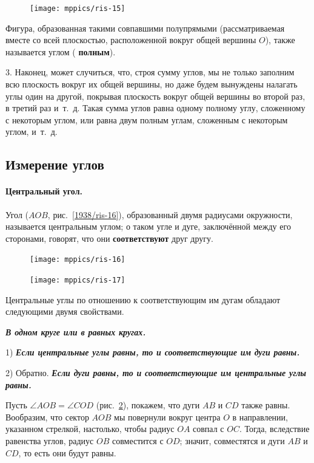 \documentclass[twoside]{book}
\makeatletter
\newcommand{\rindex}[2][\imki@jobname]{%
  \index[#1]{\detokenize{#2}}%
}
\makeatother
\begin{document}
\begin{figure}
\centering
\texttt{[image: mppics/ris-15]}
\caption{}\label{1938/ris-15}
\end{figure}

Фигура, образованная такими совпавшими полупрямыми (рассматриваемая вместе со всей плоскостью, расположенной вокруг общей вершины $O$), также называется углом (\rindex{полный угол}\textbf{полным}).


3.
Наконец, может случиться, что, строя сумму углов, мы не только заполним всю плоскость вокруг их общей вершины, но даже будем вынуждены налагать углы один на другой, покрывая плоскость вокруг общей вершины во второй раз, в третий раз и~т.~д.
Такая сумма углов равна одному полному углу, сложенному с некоторым углом, или равна двум полным углам, сложенным с некоторым углом, и~т.~д.

\subsection*{Измерение углов}


\paragraph{Центральный угол.}\label{1938/17}
Угол ($AOB$, рис.~\ref{1938/ris-16}), образованный двумя радиусами окружности, называется центральным углом;
о таком угле и дуге, заключённой между его сторонами, говорят, что они \textbf{соответствуют} друг другу.

\begin{figure}
\vskip-4mm
\centering
\texttt{[image: mppics/ris-16]}
\caption{}\label{1938/ris-16}
\bigskip
\texttt{[image: mppics/ris-17]}
\caption{}\label{1938/ris-17}
\end{figure}

Центральные углы по отношению к соответствующим им дугам обладают следующими двумя свойствами.

\textbf{\emph{В одном круге или в равных кругах.}}

1) \textbf{\emph{Если центральные углы равны, то и соответствующие им дуги равны.}}

2) Обратно.
\textbf{\emph{Если дуги равны, то и соответствующие им центральные углы равны.}}


Пусть $\angle AOB=\angle COD$ (рис.~\ref{1938/ris-17}), покажем, что дуги $AB$ и $CD$ также равны.
Вообразим, что сектор $AOB$ мы повернули вокруг центра $O$ в направлении, указанном стрелкой, настолько, чтобы радиус $OA$ совпал с $OC$.
Тогда, вследствие равенства углов, радиус $OB$ совместится с $OD$;
значит, совместятся и дуги $AB$ и $CD$, то есть
они будут равны.
\end{document}
